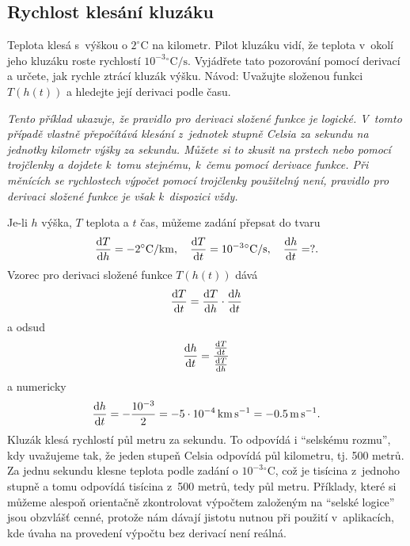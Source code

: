 \konec


\stranka


\subsection{Rychlost klesání kluzáku}
Teplota klesá s výškou o $2^\circ \mathrm C$ na kilometr. Pilot
kluzáku vidí, že teplota v okolí jeho kluzáku roste rychlostí
$10^{-3}{}^\circ \mathrm C/\mathrm{s}$. Vyjádřete tato pozorování pomocí
derivací a určete, jak rychle ztrácí kluzák výšku. Návod: Uvažujte složenou funkci $T(h(t))$ a hledejte její derivaci podle času.

\textit{Tento příklad ukazuje, že pravidlo pro derivaci složené funkce je logické. V tomto případě vlastně přepočítává klesání z jednotek stupně Celsia za sekundu na jednotky kilometr výšky za sekundu. Můžete si to zkusit na prstech nebo pomocí trojčlenky a dojdete k tomu stejnému, k čemu pomocí derivace funkce. Při měnících se rychlostech výpočet pomocí trojčlenky použitelný není, pravidlo pro derivaci složené funkce je však k dispozici vždy.}

\reseni
Je-li $h$ výška, $T$ teplota a $t$ čas, můžeme zadání přepsat do tvaru
\begin{equation*}
  \frac{\mathrm{d}T}{\mathrm{d}h}=-2^\circ\mathrm C/\mathrm{km}, \quad
  \frac{\mathrm{d}T}{\mathrm{d}t}= 10^{-3}{}^\circ\mathrm C/\mathrm{s}, \quad
  \frac{\mathrm{d}h}{\mathrm{d}t}=?.
\end{equation*}
Vzorec pro derivaci složené funkce $T(h(t))$ dává
\begin{equation*}
  \frac{\mathrm{d}T}{\mathrm{d}t} = \frac{\mathrm{d}T}{\mathrm{d}h} \cdot \frac{\mathrm{d}h}{\mathrm{d}t}
\end{equation*}
a odsud
\begin{equation*}
  \frac{\mathrm{d}h}{\mathrm{d}t} = \frac{\frac{\mathrm{d}T}{\mathrm{d}t}}{\frac{\mathrm{d}T}{\mathrm{d}h}}
\end{equation*}
a numericky
\begin{equation*}
  \frac{\mathrm{d}h}{\mathrm{d}t} = -\frac{10^{-3}}{2}=-5\cdot 10^{-4}\, \mathrm{km}\,\mathrm{s^{-1}}=-0.5 \,\mathrm{m}\,\mathrm{s}^{-1}.
\end{equation*}
Kluzák klesá rychlostí půl metru za sekundu. To odpovídá i ``selskému rozmu'', kdy uvažujeme tak, že jeden stupeň Celsia odpovídá půl kilometru, tj. 500 metrů. Za jednu sekundu klesne teplota podle zadání o $10^{-3}{}^\circ\mathrm{C}$, což je tisícina z jednoho stupně a tomu odpovídá tisícina z 500 metrů, tedy půl metru. Příklady, které si můžeme alespoň orientačně zkontrolovat výpočtem založeným na ``selské logice'' jsou obzvlášť cenné, protože nám dávají jistotu nutnou při použití v aplikacích, kde úvaha na provedení výpočtu bez derivací není reálná. 

